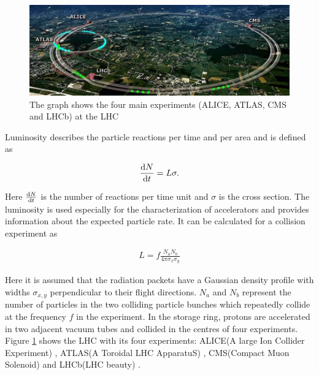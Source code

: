 \documentclass[12pt, a4paper]{thesis}
\begin{document}
\begin{figure}[H]
  \centering
  \includegraphics[width=\textwidth]{../images/lhc.jpeg}
  \caption{The graph shows the four main experiments (ALICE, ATLAS, CMS and LHCb) at the LHC \cite{lhcmap}}
  \label{4experiments}
\end{figure}



Luminosity describes the particle reactions per time and per area and is defined
as

\begin{align}
  \dv{N}{t} = L \sigma.
\end{align}

Here \(\dv{N}{t}\) is the number of reactions per time unit and
$\sigma$ is the cross section.  The luminosity is used especially for
the characterization of accelerators and provides information about
the expected particle rate. It can be calculated for a collision
experiment as

\begin{align}
  L = f \frac{N_{a}N_{b}}{4 \pi \sigma_{x} \sigma_{y}}
\end{align}

Here it is assumed that the radiation packets have a Gaussian density
profile with widths \(\sigma_{x,y}\) perpendicular to their flight
directions.  \(N_{a}\) and \(N_{b}\) represent the number of particles in
the two colliding particle bunches which repeatedly collide at the
frequency \(f\) in the experiment.  In the storage ring, protons are
accelerated in two adjacent vacuum tubes and collided in the centres
of four experiments. Figure \ref{4experiments} shows the LHC with its
four experiments: ALICE(A large Ion Collider Experiment) \cite{alice},
ATLAS(A Toroidal LHC ApparatuS) \cite{atlas}, CMS(Compact Muon
Solenoid) \cite{cms} and LHCb(LHC beauty) \cite{lhcb}.
\end{document}
